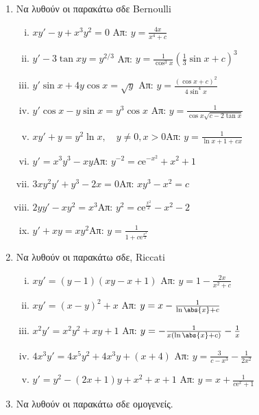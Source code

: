 \documentclass[a4paper,table]{report}
\begin{document}
\begin{enumerate}
  \item Να λυθούν οι παρακάτω σδε \textlatin{Bernoulli}

    \begin{enumerate}[i)]
      \item $xy'-y+x^{3}y^{2}=0$ \hfill Απ: $ y= \frac{4x}{x^{4}+c} $ %
      \item $ y'-3 \tan{xy} =y^{2/3} $  %
        \hfill Απ: $ y= \frac{1}{\cos^{3}{x}}\left(\frac{1}{3} \sin{x} + c\right)^{3}$  
      \item $ y' \sin{x} + 4y \cos{x} = \sqrt{y} $ %
        \hfill Απ: $ y= \frac{(\cos{x} +c)^{2}}{4 \sin^{4}{x}} $ 
      \item $ y' \cos{x} - y \sin{x} = y^{3} \cos{x} $  %
        \hfill Απ: $ y = \frac{1}{\cos{x} \sqrt{c- 2 \tan{x}}} $
      \item $xy'+y=y^2\ln x, \quad y\neq 0, x>0$\hfill Απ: $y=\frac{1}{\ln x+1+cx}$
      \item $y'=x^3y^3-xy$\hfill Απ: $y^{-2}=c \mathrm{e}^{-x^2}+x^2+1$
      \item $3xy^2y'+y^3-2x=0$\hfill Απ: $xy^3-x^2=c$
      \item $2yy'-xy^2=x^3$\hfill Απ: $y^2=c \mathrm{e}^{\frac{x^2}{2}}-x^2-2$
      \item $y'+xy=xy^2$\hfill Απ: $y=\frac{1}{1+c \mathrm{e}^{\frac{x^2}{2}}}$
    \end{enumerate}

  \item Να λυθούν οι παρακάτω σδε, \textlatin{Riccati}
    \begin{enumerate}[i)]
      \item $xy'=(y-1)(xy-x+1)$ \hfill Απ: $y=1-\frac{2x}{x^2+c}$
      \item $xy'=(x-y)^2+x$ \hfill Απ: $y=x-\frac{1}{\ln\abs{x}+c}$
      \item $x^2y'=x^2y^2+xy+1$ \hfill Απ: $y=-\frac{1}{x(\ln\abs{x}+c)}-\frac{1}{x}$
      \item $4x^3y'=4x^5y^2+4x^3y+(x+4)$ \hfill Απ: $y=\frac{3}{c-x^3}-\frac{1}{2x^2}$
      \item $y'=y^2-(2x+1)y+x^2+x+1$ \hfill Απ: $y=x+\frac{1}{c \mathrm{e}^x+1}$
    \end{enumerate}

  \item Να λυθούν οι παρακάτω σδε ομογενείς.


\end{enumerate}
\end{document}
